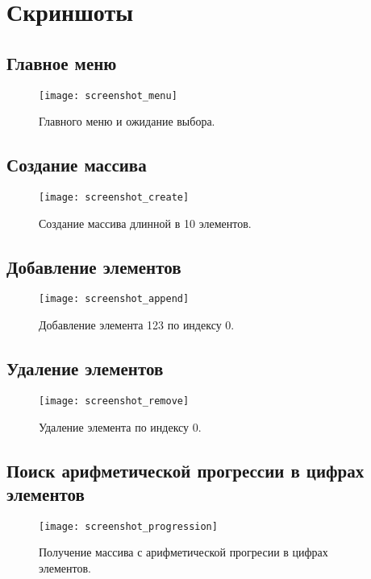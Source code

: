 \section{Скриншоты}

\subsection{Главное меню}
\begin{figure}[H]
  \centering
  \texttt{[image: screenshot\_menu]}
  \caption{Главного меню и ожидание выбора.}
\end{figure}

\subsection{Создание массива}
\begin{figure}[H]
  \centering
  \texttt{[image: screenshot\_create]}
  \caption{Создание массива длинной в 10 элементов.}
\end{figure}

\subsection{Добавление элементов}
\begin{figure}[H]
  \centering
  \texttt{[image: screenshot\_append]}
  \caption{Добавление элемента 123 по индексу 0.}
\end{figure}

\subsection{Удаление элементов}
\begin{figure}[H]
  \centering
  \texttt{[image: screenshot\_remove]}
  \caption{Удаление элемента по индексу 0.}
\end{figure}

\subsection{Поиск арифметической прогрессии в цифрах элементов}
\begin{figure}[H]
  \centering
  \texttt{[image: screenshot\_progression]}
  \caption{Получение массива с арифметической прогресии в цифрах элементов.}
\end{figure}

